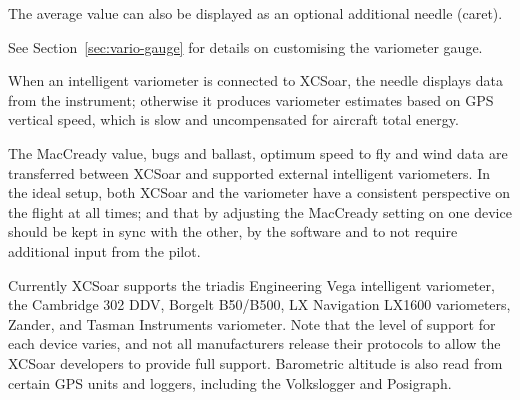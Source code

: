 \documentclass[a4paper,12pt]{refrep}
\begin{document}

The average value can also be displayed as an optional additional
needle (caret).

See Section~\ref{sec:vario-gauge} for details on customising the variometer
gauge.

When an intelligent variometer is connected to XCSoar, the needle
displays data from the instrument; otherwise it produces variometer
estimates based on GPS vertical speed, which is slow and uncompensated
for aircraft total energy.  

The MacCready value, bugs and ballast, optimum speed to fly and wind
data are transferred between XCSoar and supported external intelligent
variometers.  In the ideal setup, both XCSoar and the variometer have
a consistent perspective on the flight at all times; and that by
adjusting the MacCready setting on one device should be kept in sync
with the other, by the software and to not require additional input from
the pilot.

Currently XCSoar supports the triadis Engineering Vega intelligent
variometer, the Cambridge 302 DDV, Borgelt B50/B500, LX Navigation
LX1600 variometers, Zander, and Tasman Instruments variometer.  Note
that the level of support for each device varies, and not all
manufacturers release their protocols to allow the XCSoar developers
to provide full support.  Barometric altitude is also read from
certain GPS units and loggers, including the Volkslogger and
Posigraph. %
\end{document}
